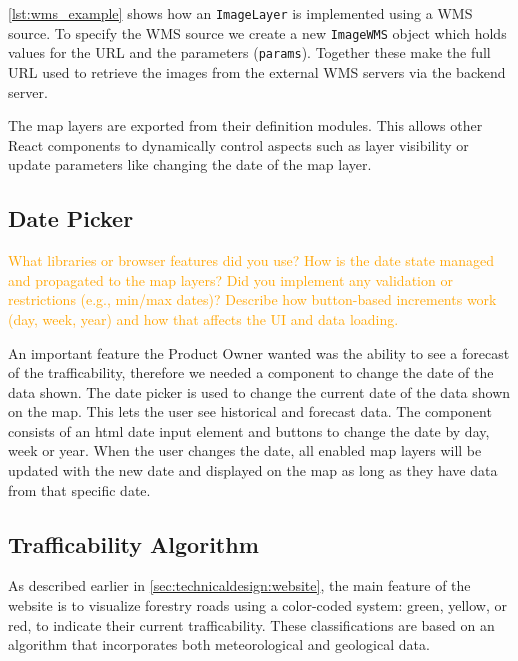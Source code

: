 \autoref{lst:wms_example} shows how an \texttt{ImageLayer} is implemented using a WMS source. To specify the WMS source we create a new \texttt{ImageWMS} object which holds values for the URL and the parameters (\texttt{params}). Together these make the full URL used to retrieve the images from the external WMS servers via the backend server.

The map layers are exported from their definition modules. This allows other React components to dynamically control aspects such as layer visibility or update parameters like changing the date of the map layer.

\begin{figure}[h]

\end{figure}

\subsection{Date Picker}

\textcolor{orange}{What libraries or browser features did you use?
How is the date state managed and propagated to the map layers?
Did you implement any validation or restrictions (e.g., min/max dates)?
Describe how button-based increments work (day, week, year) and how that affects the UI and data loading.}

An important feature the Product Owner wanted was the ability to see a forecast of the trafficability, therefore we needed a component to change the date of the data shown. The date picker is used to change the current date of the data shown on the map. This lets the user see historical and forecast data. The component consists of an \acrshort{html} date input element and buttons to change the date by day, week or year. When the user changes the date, all enabled map layers will be updated with the new date and displayed on the map as long as they have data from that specific date.

\subsection{Trafficability Algorithm}\label{subsec:implementation:website:trafficability_algorithm}

As described earlier in \autoref{sec:technicaldesign:website}, the main feature of the website is to visualize forestry roads using a color-coded system: green, yellow, or red, to indicate their current trafficability.
These classifications are based on an algorithm that incorporates both meteorological and geological data.

